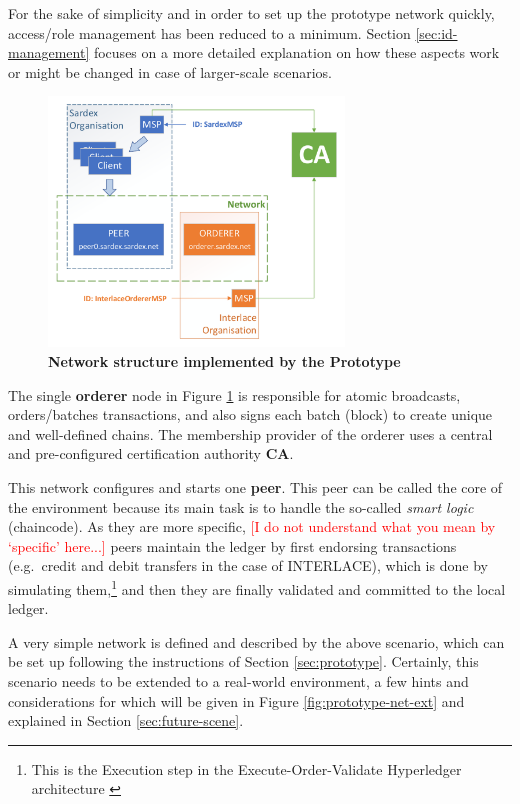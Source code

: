 For the sake of simplicity and in order to set up the prototype network quickly, access/role management has been reduced to a minimum. Section \ref{sec:id-management} focuses on a more detailed explanation on how these aspects work or might be changed in case of larger-scale scenarios.  

\begin{figure}[htbp]
  \centering
  \includegraphics[width=0.7\textwidth, clip, trim=1mm 1mm 1mm 1mm]{Figures/basic-network}
  \caption{\bf\small Network structure implemented by the Prototype}
  \label{fig:prototype-net}
\end{figure}

The single \textbf{orderer} node in Figure \ref{fig:prototype-net} is responsible for atomic broadcasts, orders/batches transactions, and also signs each batch (block) to create unique and well-defined chains. The membership provider of the orderer uses a central and pre-configured certification authority \textbf{CA}.

This network configures and starts one \textbf{peer}. This peer can be called the core of the environment because its main task is to handle the so-called \textit{smart logic} (chaincode). As they are more specific, \textcolor{red}{[I do not understand what you mean by `specific' here...]} peers maintain the ledger by first endorsing transactions (e.g.\ credit and debit transfers in the case of INTERLACE), which is done by simulating them,\footnote{This is the Execution step in the Execute-Order-Validate Hyperledger architecture \cite{AndroulakiEtAl2018}} and then they are finally validated and committed to the local ledger.

A very simple network is defined and described by the above scenario, which can be set up following the instructions of Section \ref{sec:prototype}. Certainly, this scenario needs to be extended to a real-world environment, a few hints and considerations for which will be given in Figure \ref{fig:prototype-net-ext} and explained in Section \ref{sec:future-scene}.

